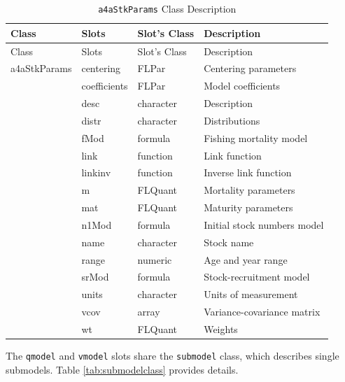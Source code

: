 \documentclass[
]{book}
\begin{document}
\begin{longtable}[]{@{}llll@{}}
\caption{\label{tab:a4aStkParamsclass} \texttt{a4aStkParams} Class Description}\tabularnewline
\toprule\noalign{}
Class & Slots & Slot's Class & Description \\
\midrule\noalign{}
\endfirsthead
\toprule\noalign{}
Class & Slots & Slot's Class & Description \\
\midrule\noalign{}
\endhead
\bottomrule\noalign{}
\endlastfoot
a4aStkParams & centering & FLPar & Centering parameters \\
& coefficients & FLPar & Model coefficients \\
& desc & character & Description \\
& distr & character & Distributions \\
& fMod & formula & Fishing mortality model \\
& link & function & Link function \\
& linkinv & function & Inverse link function \\
& m & FLQuant & Mortality parameters \\
& mat & FLQuant & Maturity parameters \\
& n1Mod & formula & Initial stock numbers model \\
& name & character & Stock name \\
& range & numeric & Age and year range \\
& srMod & formula & Stock-recruitment model \\
& units & character & Units of measurement \\
& vcov & array & Variance-covariance matrix \\
& wt & FLQuant & Weights \\
\end{longtable}

The \texttt{qmodel} and \texttt{vmodel} slots share the \texttt{submodel} class, which describes single submodels. Table \ref{tab:submodelclass} provides details.
\end{document}
